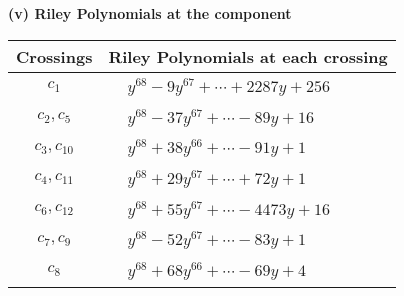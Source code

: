 \documentclass[1p]{elsarticle_modified}
\theoremstyle{definition}
\begin{document}
\flushleft \textbf{(v) Riley Polynomials at the component}\newline \\
\begin{tabular}{m{50pt}|m{274pt}}
Crossings & \hspace{64pt}Riley Polynomials at each crossing \\
\hline $$\begin{aligned}c_{1}\end{aligned}$$&$\begin{aligned}
&y^{68}-9 y^{67}+\cdots+2287 y+256
\end{aligned}$\\
\hline $$\begin{aligned}c_{2},c_{5}\end{aligned}$$&$\begin{aligned}
&y^{68}-37 y^{67}+\cdots-89 y+16
\end{aligned}$\\
\hline $$\begin{aligned}c_{3},c_{10}\end{aligned}$$&$\begin{aligned}
&y^{68}+38 y^{66}+\cdots-91 y+1
\end{aligned}$\\
\hline $$\begin{aligned}c_{4},c_{11}\end{aligned}$$&$\begin{aligned}
&y^{68}+29 y^{67}+\cdots+72 y+1
\end{aligned}$\\
\hline $$\begin{aligned}c_{6},c_{12}\end{aligned}$$&$\begin{aligned}
&y^{68}+55 y^{67}+\cdots-4473 y+16
\end{aligned}$\\
\hline $$\begin{aligned}c_{7},c_{9}\end{aligned}$$&$\begin{aligned}
&y^{68}-52 y^{67}+\cdots-83 y+1
\end{aligned}$\\
\hline $$\begin{aligned}c_{8}\end{aligned}$$&$\begin{aligned}
&y^{68}+68 y^{66}+\cdots-69 y+4
\end{aligned}$\\
\hline
\end{tabular}\\~\\
\end{document}
